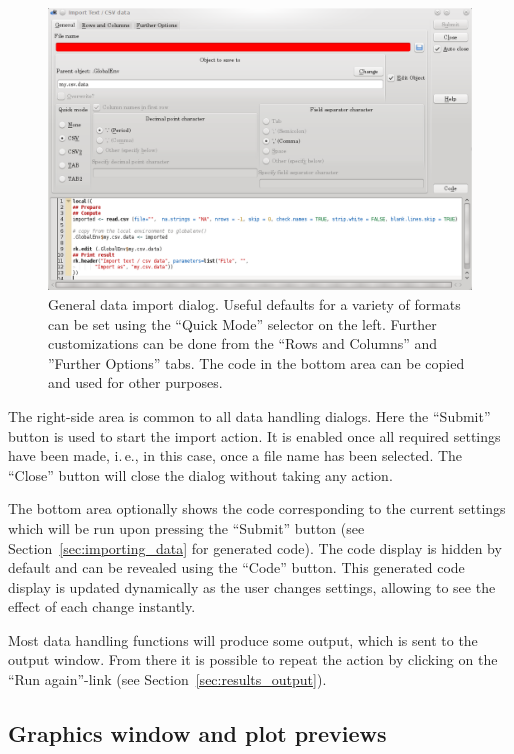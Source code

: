\begin{figure}[b!]
 \centering
 \includegraphics[width=15.5cm]{../figures/CSV_import.png}
 \caption{General data import dialog. Useful defaults for a variety of formats can
  be set using the ``Quick Mode'' selector on the left. Further customizations can be done
  from the ``Rows and Columns'' and ''Further Options'' tabs. The 
  code in the bottom area can be copied and used for other purposes.}
 \label{fig:CSV_import}
\end{figure}

The right-side area is common to all data handling
dialogs. Here the ``Submit'' button is used
to start the import action. It is enabled once all required
settings have been made, i.\,e., in this case, once a file name has been
selected. The ``Close'' button will close the
dialog without taking any action.

The bottom area optionally shows the 
code corresponding to the current settings  which will be run
upon pressing the ``Submit'' button (see Section~\ref{sec:importing_data} for generated  code). 
The code display is hidden by default and can be revealed using
the ``Code'' button. This 
generated code display is updated dynamically as the user changes settings, allowing
to see the effect of each change instantly.

Most data handling functions will produce some output, which is
sent to the output window. From there it is possible to repeat the
action by clicking on the ``Run again''-link
(see Section~\ref{sec:results_output}).

\subsection{Graphics window and plot previews}
\label{sec:plot_previews}

